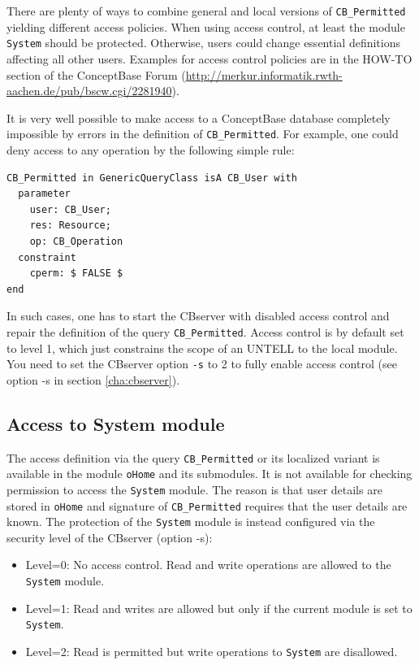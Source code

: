 There are plenty of ways to combine general and local versions of {\tt CB\_Permitted}
yielding different access policies. When using access control, at least the module
{\tt System} should be protected. Otherwise, users could change essential definitions
affecting all other users. Examples for access control policies are in the HOW-TO section of the
ConceptBase Forum (\url{http://merkur.informatik.rwth-aachen.de/pub/bscw.cgi/2281940}).

It is very well possible to make access to a ConceptBase database completely impossible
by errors in the definition of {\tt CB\_Permitted}. For example, one could deny access
to any operation by the following simple rule:

\begin{verbatim}
CB_Permitted in GenericQueryClass isA CB_User with
  parameter
    user: CB_User;
    res: Resource;
    op: CB_Operation
  constraint
    cperm: $ FALSE $
end
\end{verbatim}

In such cases, one has to start the CBserver with disabled access control and repair the
definition of the query {\tt CB\_Permitted}. 
Access control is by default set to level 1, which just constrains the scope of an
UNTELL to the local module. You need to set the CBserver option {\tt -s} to 2 to
fully enable access control (see option -s in section \ref{cha:cbserver}).


\subsection{Access to System module} \label{sec:system_access}

The access definition via the query {\tt CB\_Permitted} or its localized variant
is available in the module {\tt oHome} and its submodules. It is not available
for checking permission to access the {\tt System} module. The reason is that
user details are stored in {\tt oHome} and signature of {\tt CB\_Permitted}
requires that the user details are known. The protection of the {\tt System}
module is instead configured via the security level of the CBserver (option -s):


\begin{itemize}
\item Level=0: No access control. Read and write operations are allowed to the
{\tt System} module.
\item Level=1: Read and writes are allowed but only if the current module is set
to {\tt System}.
\item Level=2: Read is permitted but write operations to {\tt System} are disallowed.
\end{itemize}



